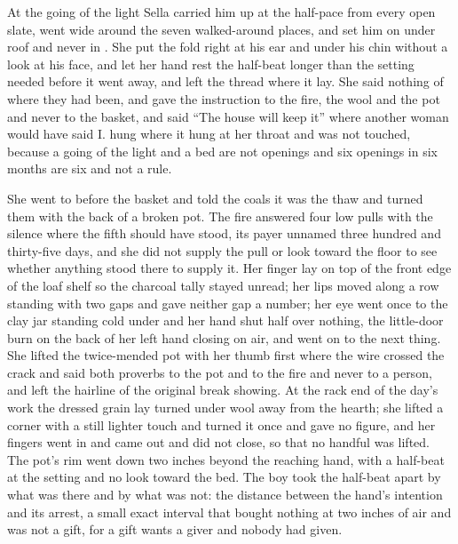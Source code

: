 \scenebreak

At the going of the light Sella carried him up at the half-pace from every open slate, went wide around the seven walked-around places, and set him on  under  roof and never in . She put the fold right at his ear and under his chin without a look at his face, and let her hand rest the half-beat longer than the setting needed before it went away, and left the thread where it lay. She said nothing of where they had been, and gave the instruction to the fire, the wool and the pot and never to the basket, and said “The house will keep it” where another woman would have said I.  hung where it hung at her throat and was not touched, because a going of the light and a bed are not openings and six openings in six months are six and not a rule.

She went to  before the basket and told the coals it was the thaw and turned them with the back of a broken pot. The fire answered four low pulls with the silence where the fifth should have stood, its payer unnamed three hundred and thirty-five days, and she did not supply the pull or look toward the floor to see whether anything stood there to supply it. Her finger lay on top of the front edge of the loaf shelf so the charcoal tally stayed unread; her lips moved along a row standing with two gaps and gave neither gap a number; her eye went once to the clay jar standing cold under  and her hand shut half over nothing, the little-door burn on the back of her left hand closing on air, and went on to the next thing. She lifted the twice-mended pot with her thumb first where the wire crossed the crack and said both proverbs to the pot and to the fire and never to a person, and left the hairline of the original break showing. At the rack end of the day's work the dressed grain lay turned under wool away from the hearth; she lifted a corner with a still lighter touch and turned it once and gave no figure, and her fingers went in and came out and did not close, so that no handful was lifted. The pot's rim went down two inches beyond the reaching hand, with a half-beat at the setting and no look toward the bed. The boy took the half-beat apart by what was there and by what was not: the distance between the hand's intention and its arrest, a small exact interval that bought nothing at two inches of air and was not a gift, for a gift wants a giver and nobody had given.

